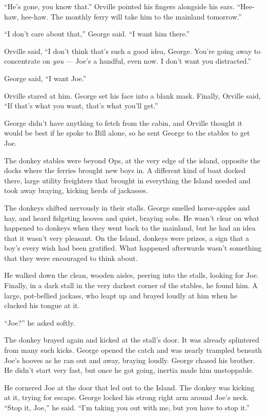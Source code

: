 ``He's gone, you know that.'' Orville pointed his fingers alongside
his ears.
``Hee-haw, hee-haw. The monthly ferry will take him to the mainland tomorrow.''

``I don't care about that,'' George said. ``I want him there.''

Orville said,
``I don't think that's such a good idea, George. You're going away to 
concentrate on \emph{you} --- Joe's a handful, even now. I don't want you 
distracted.''

George said, ``I want Joe.''

Orville stared at him. George set his face into a blank mask.
Finally, Orville said,
``If that's what you want, that's what you'll get.''

\tb

George didn't have anything to fetch from the cabin, and Orville
thought it would be best if he spoke to Bill alone, so he sent
George to the stables to get Joe.

The donkey stables were beyond Ops, at the very edge of the island,
opposite the docks where the ferries brought new boys in. A
different kind of boat docked there, large utility freighters that
brought in everything the Island needed and took away braying,
kicking herds of jackasses.

The donkeys shifted nervously in their stalls. George smelled
horse-apples and hay, and heard fidgeting hooves and quiet, braying
sobs. He wasn't clear on what happened to donkeys when they went
back to the mainland, but he had an idea that it wasn't very
pleasant. On the Island, donkeys were prizes, a sign that a boy's
every wish had been gratified. What happened afterwards wasn't
something that they were encouraged to think about.

He walked down the clean, wooden aisles, peering into the stalls,
looking for Joe. Finally, in a dark stall in the very darkest
corner of the stables, he found him. A large, pot-bellied jackass,
who leapt up and brayed loudly at him when he clucked his tongue at
it.

``Joe?'' he asked softly.

The donkey brayed again and kicked at the stall's door. It was
already splintered from many such kicks. George opened the catch
and was nearly trampled beneath Joe's hooves as he ran out and
away, braying loudly. George chased his brother. He didn't start
very fast, but once he got going, inertia made him unstoppable.

He cornered Joe at the door that led out to the Island. The donkey
was kicking at it, trying for escape. George locked his strong
right arm around Joe's neck. ``Stop it, Joe,'' he said.
``I'm taking you out with me, but you have to stop it.''

